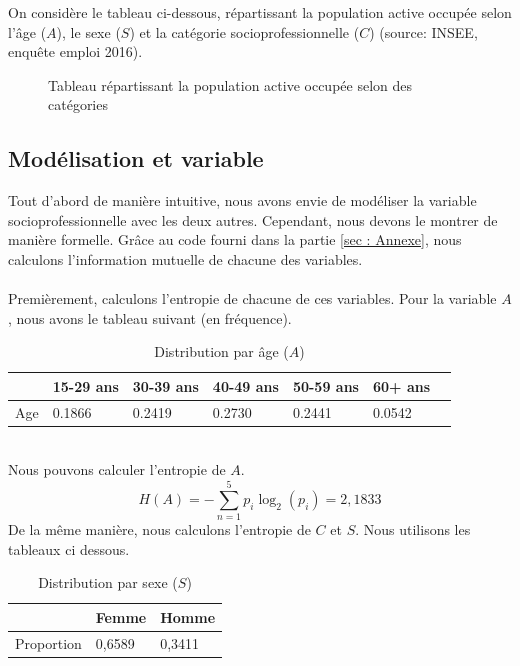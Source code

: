 \documentclass{article}
\begin{document}
On considère le tableau ci-dessous, répartissant la population active occupée selon l'âge ($A$), le sexe ($S$) et la
catégorie socioprofessionnelle ($C$) (source: INSEE, enquête emploi 2016).
\begin{figure}[ht]
  \centering
  \setlength{\fboxsep}{0pt}  %
  \setlength{\fboxrule}{1pt}  %
  \caption{Tableau répartissant la population active occupée selon des catégories }
\end{figure}
\subsection{Modélisation et variable}
\label{1.1}
Tout d'abord de manière intuitive, nous avons envie de modéliser la variable
socioprofessionnelle avec les deux autres. Cependant, nous devons
le montrer de manière formelle. Grâce au code fourni dans la partie \ref{sec : Annexe},
nous calculons l'information mutuelle de chacune des variables.\\\\
Premièrement, calculons l'entropie de chacune de ces variables. Pour la variable $A$, nous avons le tableau suivant (en fréquence). 
\begin{table}[ht]
  \centering
  \caption{Distribution par âge ($A$)}
  \begin{tabular}{|l|l|l|l|l|l|l|}
    \hline
    & 15-29 ans  & 30-39 ans  & 40-49 ans  & 50-59 ans  & 60+ ans \\ \hline
    Age & 0.1866 & 0.2419 & 0.2730 & 0.2441 & 0.0542 \\ \hline
  \end{tabular}
\end{table}
\\Nous pouvons calculer l'entropie de $A$.\\
\[
H(A) = -\sum_{n = 1}^{5}p_i\log_2(p_i)=2,1833
\]
De la même manière, nous calculons l'entropie de $C$ et $S$. Nous utilisons les tableaux ci dessous.\\
\begin{table}[H]
  \centering
  \caption{Distribution par sexe ($S$)}
  \begin{tabular}{|l|l|l|}
  \hline
             & Femme  & Homme  \\ \hline
  Proportion & 0,6589 & 0,3411 \\ \hline
  \end{tabular}
\end{table}
\end{document}
